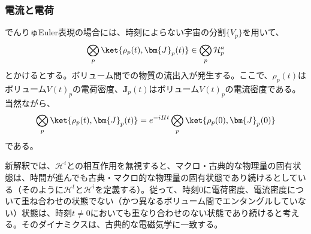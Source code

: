 \subsubsection{電流と電荷}
でんりゅEuler表現の場合には、時刻によらない宇宙の分割$\{V_p\}$を用いて、
\begin{equation}
    \label{eq:euler_classical_fluid_state}
    \bigotimes_p \ket{\rho_p(t),\bm{J}_p(t)} \in \bigotimes_p \mathcal{H}_p^a
\end{equation}
とかけるとする。ボリューム間での物質の流出入が発生する。ここで、$\rho_p(t)$はボリューム$V(t)_p$の電荷密度、$\bm{J}_p(t)$はボリューム$V(t)_p$の電流密度である。
当然ながら、
\begin{equation}
    \bigotimes_p \ket{\rho_p(t),\bm{J}_p(t)} = e^{-iHt}\bigotimes_p \ket{\rho_p(0),\bm{J}_p(0)}
\end{equation}
である。\par
新解釈では、$\mathcal{H}^i$との相互作用を無視すると、マクロ・古典的な物理量の固有状態は、時間が進んでも古典・マクロ的な物理量の固有状態であり続けるとしている（そのように$\mathcal{H}^t$と$\mathcal{H}^i$を定義する）。従って、時刻$0$に電荷密度、電流密度について重ね合わせの状態でない（かつ異なるボリューム間でエンタングルしていない）状態は、時刻$t \neq 0$においても重なり合わせのない状態であり続けると考える。そのダイナミクスは、古典的な電磁気学に一致する。